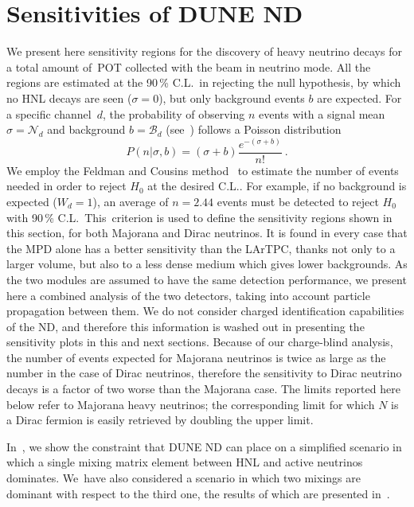 \section{Sensitivities of DUNE ND}
\label{sec:results}

We present here sensitivity regions for the discovery of heavy neutrino decays for %
a total amount of \,POT collected with the beam in neutrino mode.
All the regions are estimated at the 90\,\% C.L.\ in rejecting the null hypothesis, %
by which no HNL decays are seen ($\sigma = 0$), but only background events $b$ are expected.
For a specific channel~$d$, the probability of observing $n$ events with a signal mean $\sigma = \mathcal{N}_d$ %
and background $b = \mathcal{B}_d$ (see~) follows a Poisson distribution
\begin{equation*}
	P(n|\sigma,b) = (\sigma+b) \frac{e^{-(\sigma+b)}}{n!}\ .
\end{equation*}
We employ the Feldman and Cousins method~\cite{Feldman:1997qc} to estimate the number of events needed in order %
to reject $H_0$ at the desired C.L..
For example, if no background is expected \mbox{($W_d = 1$)}, an average of $n = 2.44$ events %
must be detected to reject $H_0$ with 90\,\% C.L.\ 
This~criterion is used to define the sensitivity regions shown in this section, for both Majorana and Dirac neutrinos.
It is found in every case that the MPD alone has a better sensitivity than the LArTPC, %
thanks not only to a larger volume, but also to a less dense medium which gives lower backgrounds.
As the two modules are assumed to have the same detection performance, we present here a combined analysis of the %
two detectors, taking into account particle propagation between them.	
We do not consider charged identification capabilities of the ND, and therefore this information is washed out %
in presenting the sensitivity plots in this and next sections.
Because of our charge-blind analysis, the number of events expected for Majorana neutrinos is twice as large as %
the number in the case of Dirac neutrinos, therefore the sensitivity to Dirac neutrino decays is %
a factor of two worse than the Majorana case.
The limits reported here below refer to Majorana heavy neutrinos; the corresponding limit for which $N$ is a Dirac fermion %
is easily retrieved by doubling the upper limit.

In~, we show the constraint that DUNE ND can place on a simplified scenario %
in which a single mixing matrix element between HNL and active neutrinos dominates.
We~have also considered a scenario in which two mixings are dominant with respect to the third one, %
the results of which are presented in~\refsec{sec:bimax}.

